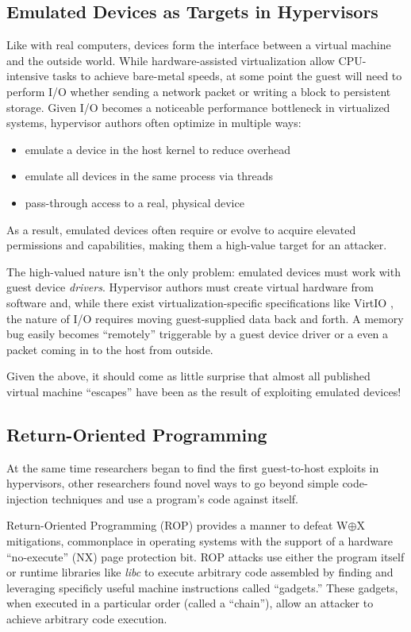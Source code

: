 \documentclass[conference]{IEEEtran}
\begin{document}
\subsection{Emulated Devices as Targets in Hypervisors}
Like with real computers, devices form the interface between a virtual
machine and the outside world. While hardware-assisted virtualization
allow CPU-intensive tasks to achieve bare-metal speeds, at some point
the guest will need to perform I/O whether sending a network packet or
writing a block to persistent storage. Given I/O becomes a noticeable
performance bottleneck in virtualized systems, hypervisor authors
often optimize in multiple ways:

\begin{itemize}
\item emulate a device in the host kernel to reduce overhead
\item emulate all devices in the same process via threads
\item pass-through access to a real, physical device
\end{itemize}

As a result, emulated devices often require or evolve to acquire
elevated permissions and capabilities, making them a high-value target
for an attacker.

The high-valued nature isn't the only problem: emulated devices must
work with guest device \emph{drivers}. Hypervisor authors must create
virtual hardware from software and, while there exist
virtualization-specific specifications like VirtIO \cite{b2}, the
nature of I/O requires moving guest-supplied data back and forth. A
memory bug easily becomes ``remotely'' triggerable by a guest device
driver or a even a packet coming in to the host from outside.

Given the above, it should come as little surprise that almost all
published virtual machine ``escapes'' \cite{b3} have been as the
result of exploiting emulated devices!


\subsection{Return-Oriented Programming}
At the same time researchers began to find the first guest-to-host
exploits in hypervisors, other researchers found novel ways to go
beyond simple code-injection techniques and use a program's code
against itself.

Return-Oriented Programming (ROP) \cite{b3} provides a manner to
defeat W$\oplus$X mitigations, commonplace in operating systems with
the support of a hardware ``no-execute'' (NX) page protection bit. ROP
attacks use either the program itself or runtime libraries like
\emph{libc} to execute arbitrary code assembled by finding and
leveraging specificly useful machine instructions called ``gadgets.''
These gadgets, when executed in a particular order (called a
``chain''), allow an attacker to achieve arbitrary code execution.
\end{document}
